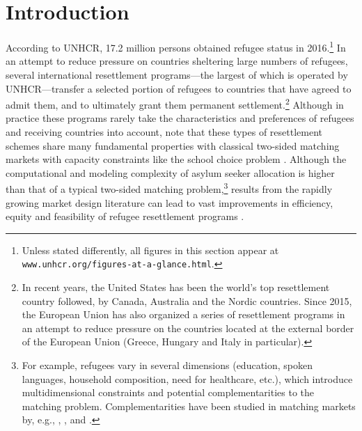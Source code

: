\documentclass[12pt,fleqn]{article}
\begin{document}

\section{Introduction}
According to UNHCR, 17.2 million persons obtained refugee status in 2016.\footnote{Unless stated differently, all figures in this section appear at \texttt{www.unhcr.org/figures-at-a-glance.html}.} In an attempt to reduce pressure on countries sheltering large numbers of refugees, several international resettlement programs---the largest of which is operated by UNHCR---transfer a selected portion of refugees to countries that have agreed to admit them, and to ultimately grant them permanent settlement.\footnote{In recent years, the United States has been the world's top resettlement country followed, by Canada, Australia and the Nordic countries. Since 2015, the European Union has also organized a series of resettlement programs in an attempt to reduce pressure on the countries located at the external border of the European Union (Greece, Hungary and Italy in particular).} Although in practice these programs rarely take the characteristics and preferences of refugees and receiving countries into account, \citet{bib:JonesTeytelboym2016b,bib:JonesTeytelboym2016a} note that these types of resettlement schemes share many fundamental properties with classical two-sided matching markets with capacity constraints like the school choice problem \citep{bib:AbdulkadirougluSonmez}. Although the computational and modeling complexity of asylum seeker allocation is higher than that of a typical two-sided matching problem,\footnote{For example, refugees vary in several dimensions (education, spoken languages, household composition, need for healthcare, etc.), which introduce multidimensional constraints and potential complementarities to the matching problem. Complementarities have been studied in matching markets by, e.g., \citet{bib:HatfieldKominers}, \citet{bib:PathakRoth}, \citet{bib:Pycia} and \citet{bib:RothPeranson}.} results from the rapidly growing market design literature can lead to vast improvements in efficiency, equity and feasibility of refugee resettlement programs \citep{bib:Andersson,bib:BansakEtAl,bib:DelacretazEtAl2016,bib:JonesTeytelboym2016b, bib:JonesTeytelboym2016a}.
\end{document}

